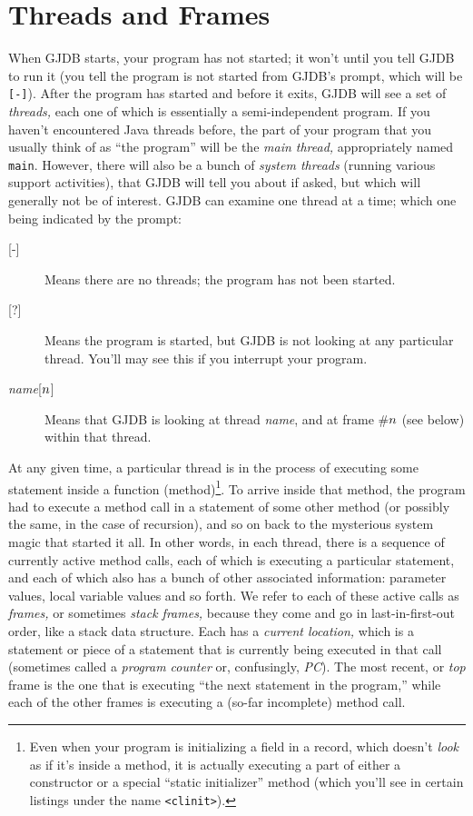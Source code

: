 \documentclass[11pt,twoside]{handout}
\begin{document}
\section{Threads and Frames}\label{sec:frames}
When GJDB starts, your program has not started; it won't until
you tell GJDB to run it (you tell the program is not started from 
GJDB's prompt, which will be {\tt[-]}). 
After the program has started and before it exits, GJDB will see a set
of {\it threads,\/} each one of which is essentially a
semi-independent program.   If you haven't encountered Java threads
before, the part of your program that you usually think of as ``the
program'' will be the 
{\it main thread,\/} appropriately named {\tt main}.
However, there will also be a bunch of 
{\it system threads} (running various support activities), that GJDB
will tell you about if asked, but which will generally not be of interest.
GJDB can examine one thread at a time; which one being indicated by the
prompt:
\begin{description}
\item[{[-]}] Means there are no threads; the program has not been
started.
\item[{[?]}] Means the program is started, but GJDB is not looking at
any particular thread.  You'll may see this if you interrupt your program.
\item[{{\it name\/}[$n\/$]}] Means that GJDB is looking at thread
{\it name\/}, and at frame \#$n\/$ (see below) within that
thread.
\end{description}

At any given time, a particular thread is in the process of executing
some statement inside a function (method)\footnote{Even when your
program is initializing a field in a record, which doesn't {\it
look\/} as if it's inside a method, it is actually executing a part of
either a constructor or a special ``static initializer'' method (which
you'll see in certain listings under the name {\tt <clinit>}).}.  To
arrive inside that method, the program had to execute a method call in
a statement of some other method (or possibly the same, in the case of
recursion), and so on back to the mysterious system magic that started
it all.  In other words, in each thread, there is a sequence of
currently active method calls, each of which is executing a particular
statement, and each of which also has a bunch of other associated
information: parameter values, local variable values and so forth.  We
refer to each of these active calls as {\it frames,\/} or sometimes
{\it stack frames,\/} because they come and go in last-in-first-out
order, like a stack data structure.  Each has a {\it current
location,\/} which is a statement or piece of a statement that is
currently being executed in that call (sometimes called a {\it program
counter\/} or, confusingly, {\it PC}).  The most recent, or {\it
top\/} frame is the one that is executing ``the next statement in the
program,'' while each of the other frames is executing a (so-far incomplete)
method call.  
\end{document}
